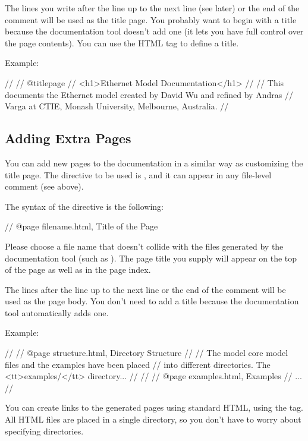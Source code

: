 The lines you write after the  line up to the next
 line (see later) or the end of the comment will be used
as the title page.
You probably want to begin with a title because the documentation
tool doesn't add one (it lets you have full control over the
page contents). You can use the  HTML tag
to define a title.

Example:

\begin{ned}
//
// @titlepage
// <h1>Ethernet Model Documentation</h1>
//
// This documents the Ethernet model created by David Wu and refined by Andras
// Varga at CTIE, Monash University, Melbourne, Australia.
//
\end{ned}


\subsection{Adding Extra Pages}

You can add new pages to the documentation in a similar way as customizing
the title page. The directive to be used is , and it can
appear in any file-level comment (see above).

The syntax of the  directive is the following:

\begin{ned}
// @page filename.html, Title of the Page
\end{ned}

Please choose a file name that doesn't collide with the files generated
by the documentation tool (such as ).
The page title you supply will appear on the top of the page as well as
in the page index.

The lines after the  line up to the next  line
or the end of the comment will be used as the page body.
You don't need to add a title because the documentation tool
automatically adds one.

Example:
\begin{ned}
//
// @page structure.html, Directory Structure
//
// The model core model files and the examples have been placed
// into different directories. The <tt>examples/</tt> directory...
//
//
// @page examples.html, Examples
// ...
//
\end{ned}

You can create links to the generated pages using standard HTML,
using the  tag. All HTML files are
placed in a single directory, so you don't have to worry about
specifying directories.

